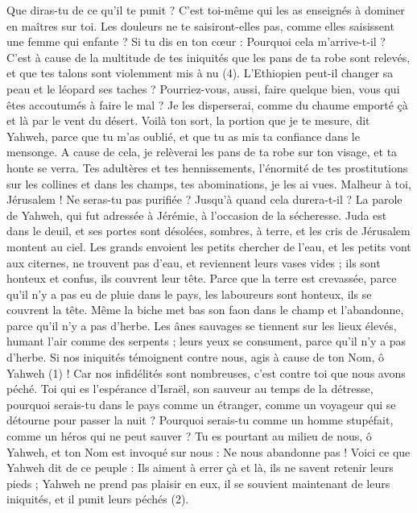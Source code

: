 \begin{multicols}{2}
Que diras-tu de ce qu’il te punit ? C’est toi-même qui les as enseignés à dominer en maîtres sur toi. Les douleurs ne te saisiront-elles pas, comme elles saisissent une femme qui enfante ?
Si tu dis en ton cœur : Pourquoi cela m’arrive-t-il ? C'est à cause de la multitude de tes iniquités que les pans de ta robe sont relevés, et que tes talons sont violemment mis à nu\FTNT{} (4).
L’Ethiopien peut-il changer sa peau et le léopard ses taches ? Pourriez-vous, aussi, faire quelque bien, vous qui êtes accoutumés à faire le mal ?
Je les disperserai, comme du chaume emporté çà et là par le vent du désert.
Voilà ton sort, la portion que je te mesure, dit Yahweh, parce que tu m'as oublié, et que tu as mis ta confiance dans le mensonge.
A cause de cela, je relèverai les pans de ta robe sur ton visage, et ta honte se verra.
Tes adultères et tes hennissements, l'énormité de tes prostitutions sur les collines et dans les champs, tes abominations, je les ai vues. Malheur à toi, Jérusalem ! Ne seras-tu pas purifiée ? Jusqu’à quand cela durera-t-il ?
\VerseOne{}La parole de Yahweh, qui fut adressée à Jérémie, à l’occasion de la sécheresse.
Juda est dans le deuil, et ses portes sont désolées, sombres, à terre, et les cris de Jérusalem montent au ciel.
Les grands envoient les petits chercher de l’eau, et les petits vont aux citernes, ne trouvent pas d'eau, et reviennent leurs vases vides ; ils sont honteux et confus, ils couvrent leur tête.
Parce que la terre est crevassée, parce qu'il n'y a pas eu de pluie dans le pays, les laboureurs sont honteux, ils se couvrent la tête.
Même la biche met bas son faon dans le champ et l'abandonne, parce qu'il n'y a pas d'herbe.
Les ânes sauvages se tiennent sur les lieux élevés, humant l'air comme des serpents ; leurs yeux se consument, parce qu'il n'y a pas d'herbe.
Si nos iniquités témoignent contre nous, agis à cause de ton Nom, ô Yahweh\FTNT{} (1) ! Car nos infidélités sont nombreuses, c'est contre toi que nous avons péché.
Toi qui es l'espérance d'Israël, son sauveur au temps de la détresse, pourquoi serais-tu dans le pays comme un étranger, comme un voyageur qui se détourne pour passer la nuit ?
Pourquoi serais-tu comme un homme stupéfait, comme un héros qui ne peut sauver ? Tu es pourtant au milieu de nous, ô Yahweh, et ton Nom est invoqué sur nous : Ne nous abandonne pas !
Voici ce que Yahweh dit de ce peuple : Ils aiment à errer çà et là, ils ne savent retenir leurs pieds ; Yahweh ne prend pas plaisir en eux, il se souvient maintenant de leurs iniquités, et il punit leurs péchés\FTNT{} (2).

\end{multicols}
